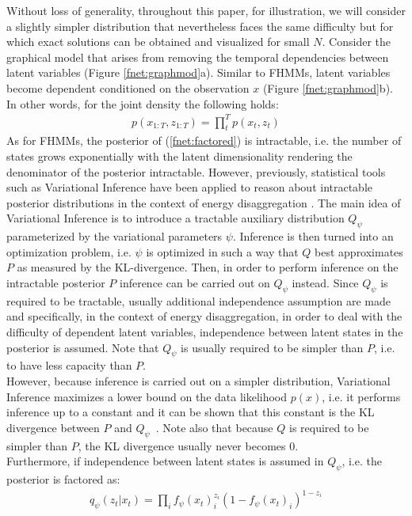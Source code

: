 Without loss of generality, throughout this paper, for illustration, we will consider a slightly simpler distribution that nevertheless faces the same difficulty but for which exact solutions can be obtained and visualized for small $N$. Consider the graphical model that arises from removing the temporal dependencies between latent variables (Figure \ref{fnet:graphmod}a). Similar to FHMMs, latent variables become dependent conditioned on the observation $x$ (Figure \ref{fnet:graphmod}b). In other words, for the joint density the following holds: 
\begin{align}
p(x_{1:T},z_{1:T}) = \prod_t^T p(x_t, z_t) \label{fnet:factored}
\end{align}
As for FHMMs, the posterior of (\ref{fnet:factored}) is intractable, i.e. the number of states grows exponentially with the latent dimensionality rendering the denominator of the posterior intractable. However, previously, statistical tools such as Variational Inference \cite{jordan1999introduction} have been applied to reason about intractable posterior distributions in the context of energy disaggregation \cite{ng2016scaling,lange2016varbolt}. The main idea of Variational Inference is to introduce a tractable auxiliary distribution $Q_\psi$ parameterized by the variational parameters $\psi$. Inference is then turned into an optimization problem, i.e. $\psi$ is optimized in such a way that $Q$ best approximates $P$ as measured by the KL-divergence. Then, in order to perform inference on the intractable posterior $P$ inference can be carried out on $Q_\psi$ instead. Since $Q_\psi$ is required to be tractable, usually additional independence assumption are made and specifically, in the context of energy disaggregation, in order to deal with the difficulty of dependent latent variables, independence between latent states in the posterior is assumed. Note that $Q_\psi$ is usually required to be simpler than $P$, i.e. to have less capacity than $P$.\\
However, because inference is carried out on a simpler distribution, Variational Inference maximizes a lower bound on the data likelihood $p(x)$, i.e. it performs inference up to a constant and it can be shown that this constant is the KL divergence between $P$ and $Q_\psi$~\cite{jordan1999introduction}. Note also that because $Q$ is required to be simpler than $P$, the KL divergence usually never becomes 0.\\
Furthermore, if independence between latent states is assumed in $Q_\psi$, i.e. the posterior is factored as:
\begin{align}
q_\psi(z_{t}|x_{t}) = \prod_i f_\psi(x_t)_i^{z_i}(1-f_\psi(x_t)_i)^{1-z_i} \label{fnet:aux_dist}
\end{align}
